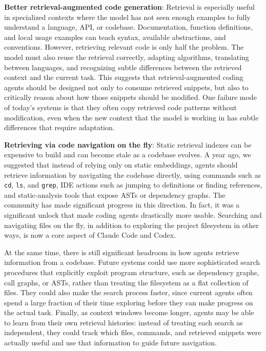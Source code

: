 \textbf{Better retrieval-augmented code generation}: Retrieval is especially useful in 
specialized contexts where the model has not seen enough examples to fully understand a 
language, API, or codebase. Documentation, function definitions, and local usage examples 
can teach syntax, available abstractions, and conventions. However, retrieving relevant 
code is only half the problem. The model must also reuse the retrieval correctly, 
adapting algorithms, translating between languages, and recognizing subtle differences 
between the retrieved context and the current task. This suggests that retrieval-augmented 
coding agents should be designed not only to consume retrieved snippets, but also to critically 
reason about how those snippets should be modified. One failure mode of today's systems is that they 
often copy retrieved code patterns without modification, even when the new context that the
model is working in has subtle differences that require adaptation. 


\textbf{Retrieving via code navigation on the fly}: Static retrieval indexes can be expensive to build and can become stale as a codebase evolves. 
A year ago, we suggested that instead of relying only on static embeddings, agents should retrieve information by 
navigating the codebase directly, using commands such as \texttt{cd}, \texttt{ls}, and \texttt{grep}, 
IDE actions such as jumping to definitions or finding references, and static-analysis tools that expose ASTs or 
dependency graphs. The community has made significant progress in this direction. In fact, it was
a significant unlock that made coding agents drastically more usable. Searching and navigating files
on the fly, in addition to exploring the project filesystem in other ways, is now a core aspect of Claude Code and Codex.

At the same time, there is still significant headroom in how agents retrieve information from a codebase. 
Future systems could use more sophisticated search procedures that explicitly exploit program structure,
such as dependency graphs, call graphs, or ASTs, rather than treating the filesystem as a flat collection of files. 
They could also make the search process faster, since current agents often spend a large fraction of their time 
exploring before they can make progress on the actual task. Finally, as context windows become longer, agents may be able 
to learn from their own retrieval histories: instead of treating each search as independent, they could track which files, 
commands, and retrieved snippets were actually useful and use that information to guide future navigation.


